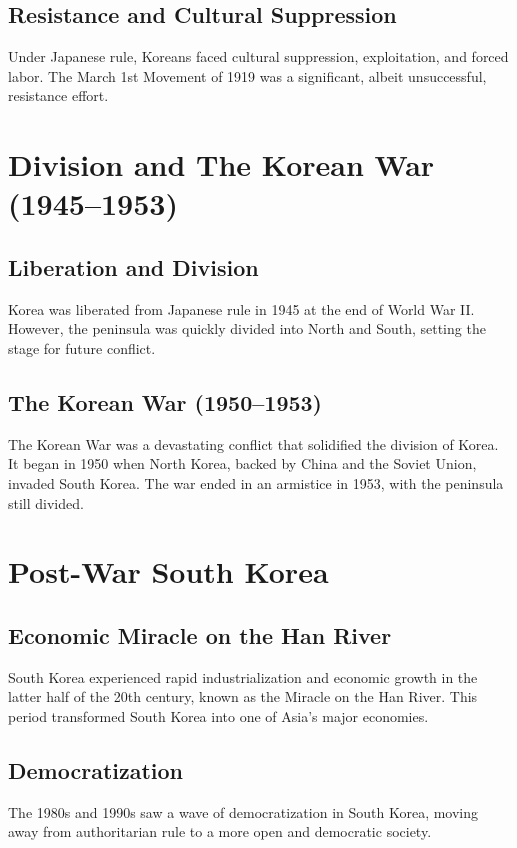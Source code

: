 \documentclass[a4paper,12pt]{book}
\begin{document}
\subsection{Resistance and Cultural Suppression}
\label{subsec:resistance-cultural-suppression}
Under Japanese rule, Koreans faced cultural suppression, exploitation, and forced labor. The March 1st Movement of 1919 was a significant, albeit unsuccessful, resistance effort.

\section{Division and The Korean War (1945–1953)}
\label{sec:division-korean-war}

\subsection{Liberation and Division}
\label{subsec:liberation-division}
Korea was liberated from Japanese rule in 1945 at the end of World War II. However, the peninsula was quickly divided into North and South, setting the stage for future conflict.

\subsection{The Korean War (1950–1953)}
\label{subsec:korean-war}
The Korean War was a devastating conflict that solidified the division of Korea. It began in 1950 when North Korea, backed by China and the Soviet Union, invaded South Korea. The war ended in an armistice in 1953, with the peninsula still divided.

\section{Post-War South Korea}
\label{sec:post-war-south-korea}

\subsection{Economic Miracle on the Han River}
\label{subsec:economic-miracle}
South Korea experienced rapid industrialization and economic growth in the latter half of the 20th century, known as the Miracle on the Han River. This period transformed South Korea into one of Asia’s major economies.

\subsection{Democratization}
\label{subsec:democratization}
The 1980s and 1990s saw a wave of democratization in South Korea, moving away from authoritarian rule to a more open and democratic society.
\end{document}
